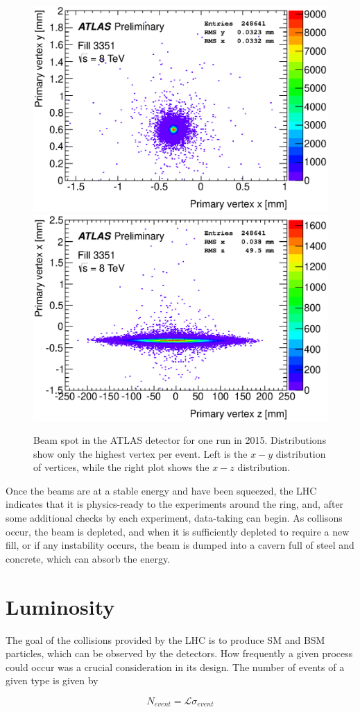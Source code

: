 \begin{centering}
\begin{figure}[!hbt]
\myfloatalign
\includegraphics[width=.45\linewidth]{figures/lhc/beamspot-run215456-vtx-yx.eps}
\includegraphics[width=.45\linewidth]{figures/lhc/beamspot-run215456-vtx-xz.eps}
\caption{Beam spot in the ATLAS detector for one run in 2015. Distributions show only the highest \pt vertex per event. Left is the $x-y$ distribution of vertices, while the right plot shows the $x-z$ distribution.}
\label{fig:beam_spot}
\end{figure}
\end{centering}

Once the beams are at a stable energy and have been squeezed, the \ac{LHC} indicates that it is physics-ready to the experiments around the ring, and, after some additional checks by each experiment, data-taking can begin. As collisons occur, the beam is depleted, and when it is sufficiently depleted to require a new fill, or if any instability occurs, the beam is dumped into a cavern full of steel and concrete, which can absorb the energy. 

\section{Luminosity}

The goal of the collisions provided by the \ac{LHC} is to produce \ac{SM} and \ac{BSM} particles, which can be observed by the detectors. How frequently a given process could occur was a crucial consideration in its design. The number of events of a given type is given by

\begin{equation}
N_{event} = \mathcal{L}\sigma_{event}
\end{equation}

